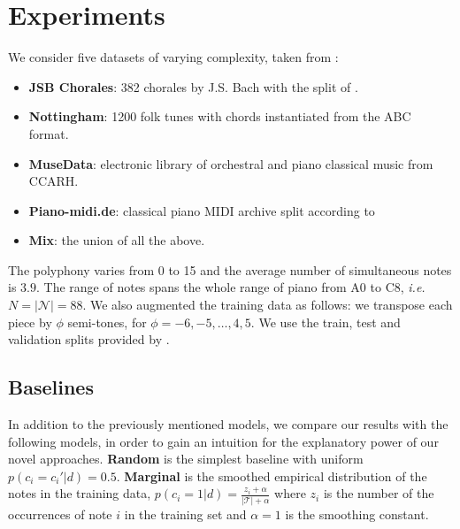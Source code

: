 \documentclass{article}
\newcommand{\N}{\mathcal{N}}
\newcommand{\T}{\mathcal{T}}
\newcommand{\ie}{\textit{i.e.}}
\begin{document}
\section{Experiments}
\label{sec:experiments}

We consider five datasets of varying complexity, taken from \cite{bl}:
\begin{itemize}
  \item \textbf{JSB Chorales}: 382 chorales by J.S. Bach with the split of  \citet{allan2005harmonising}.
 \item \textbf{Nottingham}: 1200 folk tunes with chords instantiated from the ABC format.
\item \textbf{MuseData}: electronic library of orchestral and piano classical music from CCARH.
\item \textbf{Piano-midi.de}: classical piano MIDI archive split according to \citet{poliner2007discriminative}
\item \textbf{Mix}: the union of all the above.
\end{itemize}
The polyphony varies from 0 to 15 and the average number of simultaneous notes is $3.9$. The range of notes spans the whole range of piano from A0 to C8, \ie\ $N = |\N| = 88$. We also augmented the training data as follows: we transpose each piece by $\phi$ semi-tones, for $\phi = -6, -5, \dots, 4, 5.$ We use the train, test and validation splits provided by \cite{bl}.
%
\subsection{Baselines}
In addition to the previously mentioned models, we compare our results with the following models, in order to gain an intuition for the explanatory power of our novel approaches. \textbf{Random} is the simplest baseline with uniform $p(c_i = c_i' | d ) = 0.5$. \textbf{Marginal} is the smoothed empirical distribution of the notes in the training data, $p(c_i = 1 | d )= \frac{z_i + \alpha}{|\T|+\alpha}$ where $z_i$ is the number of the occurrences of note $i$ in the training set and $\alpha = 1$ is the smoothing constant.
%
\end{document}
